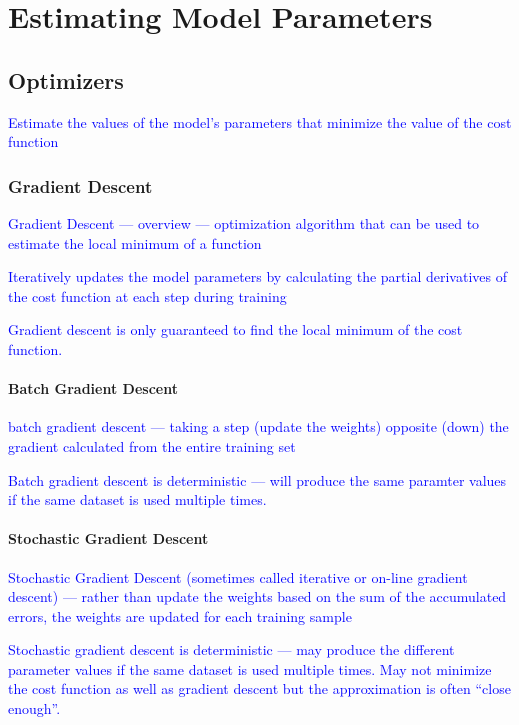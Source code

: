 \section{Estimating Model Parameters}

\subsection{Optimizers}

\textcolor{blue}{Estimate the values of the model's parameters that minimize the value of the cost function}

\subsubsection{Gradient Descent}

\textcolor{blue}{Gradient Descent --- overview --- optimization algorithm that can be used to estimate the local minimum of a function}

\textcolor{blue}{Iteratively updates the model parameters by calculating the partial derivatives of the cost function at each step during training}

\textcolor{blue}{Gradient descent is only guaranteed to find the local minimum of the cost function.}


\paragraph{Batch Gradient Descent}

\textcolor{blue}{batch gradient descent --- taking a step (update the weights) opposite (down) the gradient calculated from the entire training set}

\textcolor{blue}{Batch gradient descent is deterministic --- will produce the same paramter values if the same dataset is used multiple times.}


\paragraph{Stochastic Gradient Descent}

\textcolor{blue}{Stochastic Gradient Descent (sometimes called iterative or on-line gradient descent) --- rather than update the weights based on the sum of the accumulated errors, the weights are updated for each training sample}

\textcolor{blue}{Stochastic gradient descent is deterministic --- may produce the different parameter values if the same dataset is used multiple times. May not minimize the cost function as well as gradient descent but the approximation is often ``close enough''.}


